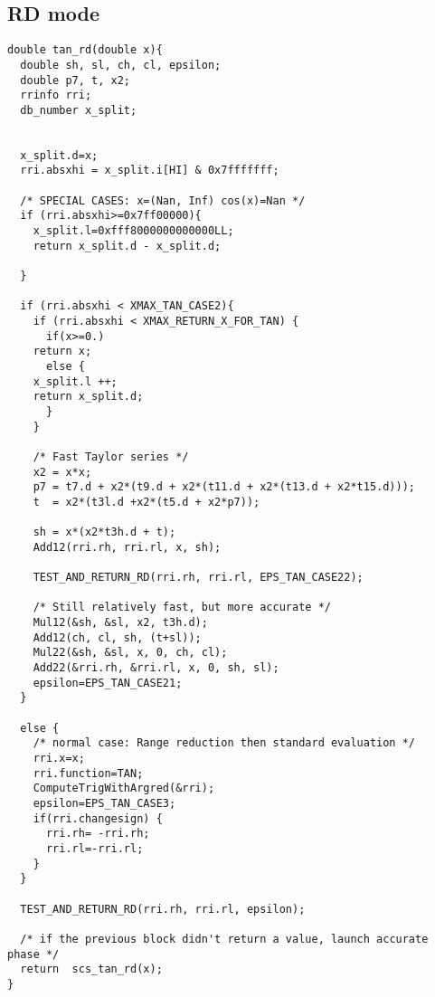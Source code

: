 \subsection{RD mode}
\begin{lstlisting}[caption={Exceptional cases for tangent RD},firstnumber=1]
double tan_rd(double x){  
  double sh, sl, ch, cl, epsilon;
  double p7, t, x2;
  rrinfo rri;
  db_number x_split;

  
  x_split.d=x;
  rri.absxhi = x_split.i[HI] & 0x7fffffff;
  
  /* SPECIAL CASES: x=(Nan, Inf) cos(x)=Nan */
  if (rri.absxhi>=0x7ff00000){
    x_split.l=0xfff8000000000000LL;
    return x_split.d - x_split.d;

  }   
  
  if (rri.absxhi < XMAX_TAN_CASE2){
    if (rri.absxhi < XMAX_RETURN_X_FOR_TAN) {
      if(x>=0.)
	return x;
      else {
	x_split.l ++;
	return x_split.d;
      }
    }
    
    /* Fast Taylor series */
    x2 = x*x;
    p7 = t7.d + x2*(t9.d + x2*(t11.d + x2*(t13.d + x2*t15.d)));
    t  = x2*(t3l.d +x2*(t5.d + x2*p7));
    
    sh = x*(x2*t3h.d + t);
    Add12(rri.rh, rri.rl, x, sh);   

    TEST_AND_RETURN_RD(rri.rh, rri.rl, EPS_TAN_CASE22);

    /* Still relatively fast, but more accurate */
    Mul12(&sh, &sl, x2, t3h.d);
    Add12(ch, cl, sh, (t+sl));
    Mul22(&sh, &sl, x, 0, ch, cl);
    Add22(&rri.rh, &rri.rl, x, 0, sh, sl);
    epsilon=EPS_TAN_CASE21; 
  }
  
  else { 
    /* normal case: Range reduction then standard evaluation */
    rri.x=x;
    rri.function=TAN;
    ComputeTrigWithArgred(&rri);
    epsilon=EPS_TAN_CASE3; 
    if(rri.changesign) {
      rri.rh= -rri.rh; 
      rri.rl=-rri.rl;
    }
  }
  
  TEST_AND_RETURN_RD(rri.rh, rri.rl, epsilon);

  /* if the previous block didn't return a value, launch accurate phase */
  return  scs_tan_rd(x);
}
\end{lstlisting}

